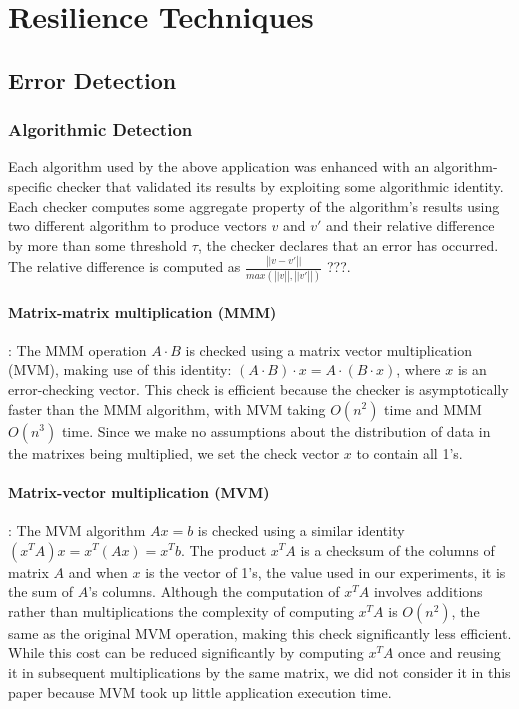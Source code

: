 \documentclass{sig-alternate}
\newcommand{\sui}[1]{%
  \textcolor{green}{SC - #1}
}
\begin{document}
\section{Resilience Techniques}
\label{sec:res_tech}

\subsection{Error Detection}
\label{sec:res_tech:err_det}

\subsubsection{Algorithmic Detection}
\label{sec:res_tech:err_det:algo}


Each algorithm used by the above application was enhanced with an algorithm-specific checker that validated its results by exploiting some algorithmic identity.
Each checker computes some aggregate property of the algorithm's results using two different algorithm to produce vectors $v$ and $v'$ and their relative difference by more than some threshold $\tau$, the checker declares that an error has occurred.
The relative difference is computed as $\frac{\left|| v-v' \right||}{max(\left||v\right||, \left||v'\right||)}$ ???.

\paragraph{Matrix-matrix multiplication (MMM)}:
The MMM operation $A \cdot B$ is checked using a matrix vector multiplication (MVM), making use of this identity: $(A \cdot B) \cdot x = A \cdot (B \cdot x)$, where $x$ is an error-checking vector.
This check is efficient because the checker is asymptotically faster than the MMM algorithm, with MVM taking $O(n^2)$ time and MMM $O(n^3)$ time.
Since we make no assumptions about the distribution of data in the matrixes being multiplied, we set the check vector $x$ to contain all 1's.

\paragraph{Matrix-vector multiplication (MVM)}:
The MVM algorithm $Ax=b$ is checked using a similar identity $(x^TA)x = x^T(Ax) = x^Tb$.
The product $x^TA$ is a checksum of the columns of matrix $A$ and when $x$ is the vector of 1's, the value used in our experiments, it is the sum of $A$'s columns.
Although the computation of $x^TA$ involves additions rather than multiplications the complexity of computing $x^TA$ is $O(n^2)$, the same as the original MVM operation, making this check significantly less efficient.
While this cost can be reduced significantly by computing $x^TA$ once and reusing it in subsequent multiplications by the same matrix, we did not consider it in this paper because MVM took up little application execution time.
\end{document}
